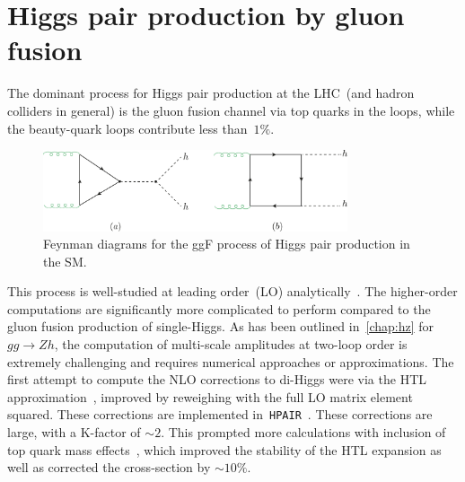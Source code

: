 \section{Higgs pair production by gluon fusion \label{ggFhh}  }
\par The dominant process for Higgs pair production at the LHC~(and hadron colliders in general) is the gluon fusion channel via top quarks in the loops, while the beauty-quark loops contribute less than~$1\%$.
%
\begin{figure}[!htpb]
	\centering
	\includegraphics[width = 0.8\textwidth]{./figures/di-higgs-LO-SM}
	\caption{Feynman diagrams for the ggF process of Higgs pair production in the SM.} 
	\label{fig_ggf_sm}
\end{figure}
%
This process is well-studied at leading order~(LO) analytically~\cite{EBOLI1987269, GLOVER1988282, DICUS1988457, Plehn:1996wb}.  The higher-order computations are significantly more complicated to perform compared to the gluon fusion production of single-Higgs. As has been outlined in~\autoref{chap:hz} for $gg \to Zh$, the computation of multi-scale amplitudes at two-loop order is extremely challenging and requires numerical approaches or approximations. The first attempt to compute the NLO corrections to di-Higgs were via the HTL approximation~\cite{Dawson:1998py, Altenkamp:2012sx,Grigo:2014jma}, improved by reweighing with the full LO matrix element squared. These corrections are implemented in~\texttt{HPAIR}~\cite{Plehn:1996wb}. These corrections are large, with a K-factor of $ \sim 2$.  This prompted more calculations with inclusion of top quark mass effects~\cite{deFlorian:2013uza,Maltoni:2014eza,Grigo:2015dia,Degrassi:2016vss}, which improved the stability of the HTL expansion as well as corrected the cross-section by $\sim 10\%$. 
